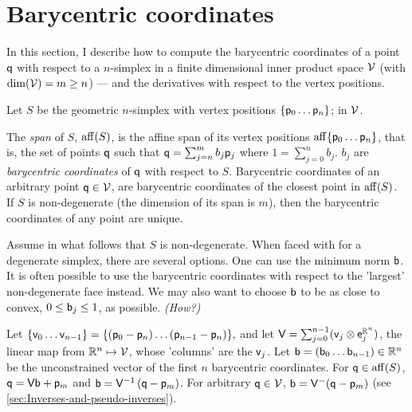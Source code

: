 
\section{Barycentric coordinates}
\label{sec:barycentric-coordinates}

In this section, I describe how to compute
the barycentric coordinates of a point $\mathsf{q}$
with respect to a $n$-simplex in
a finite dimensional inner product space $\mathcal{V}$
(with $\mathrm{dim} (\mathcal{V} ) = m \ge n$) ---
and the derivatives with respect to the vertex positions.

Let $S$ be the geometric $n$-simplex
with vertex positions $\{\mathsf{p}_0  \ldots  \mathsf{p}_n\}$;
in $\mathcal{V}$.

The {\it span} of $S$, $\affine_span ( S )$,
is the affine span of its vertex positions
$\affine_span \{\p_0  \ldots  \p_n\}$,
that is, the set of points $\mathsf{q}$ such that
$\mathsf{q} = \sum_{j=n}^{m} b_j \mathsf{p}_j $ where $1 = \sum_{j=0}^{n} b_j $.
$b_j$ are {\it barycentric coordinates} of $\mathsf{q}$ with respect to $S$.
Barycentric coordinates of an arbitrary point $\mathsf{q} \in \mathcal{V}$,
are barycentric coordinates of the closest point in $\affine_span(S)$.
If $S$ is non-degenerate (the dimension of its span is $m$),
then the barycentric coordinates of any point are unique.

Assume in what follows that $S$ is non-degenerate.
When faced with for a degenerate simplex, there are several options.
One can use the minimum norm $\mathsf{b}$.
It is often possible to use the barycentric coordinates
with respect to the 'largest' non-degenerate face instead.
We may also want to choose $\mathsf{b}$ to be as close to convex,
$0 \le \mathsf{b}_j \le 1$, as possible. {\it (How?)}

Let $\{ \mathsf{v}_0 \ldots \mathsf{v}_{n-1} \} = \{ (\mathsf{p}_0 - \mathsf{p}_n) \ldots (\mathsf{p}_{n-1} - \mathsf{p}_n)\},$
and let $\mathsf{V} = \sum_{j=0}^{n-1} ( \mathsf{v}_j \otimes \mathsf{e}_j^{\mathbb{R}^n} )$,
the linear map from $\mathbb{R}^n \mapsto \mathcal{V}$,
whose 'columns' are the $\mathsf{v}_j$.
Let $\mathsf{b} = \left( \mathsf{b}_0 \ldots \mathsf{b}_{n-1} \right) \in \mathbb{R}^n$
be the unconstrained vector of the first $n$ barycentric coordinates.
For $\q \in \affine_span ( S )$, $\mathsf{q} = \mathsf{V} \mathsf{b} + \mathsf{p}_m$
and $\mathsf{b} = \mathsf{V}^{-1} \left ( \mathsf{q} - \mathsf{p}_m \right)$.
For arbitrary $\mathsf{q} \in \mathcal{V}$,
$\mathsf{b} = \mathsf{V}^{-} (\mathsf{q} - \mathsf{p}_m)$
(see \autoref{sec:Inverses-and-pseudo-inverses}).













